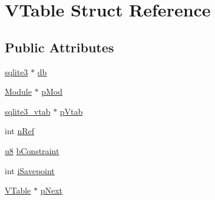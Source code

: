 \hypertarget{struct_v_table}{\section{V\-Table Struct Reference}
\label{struct_v_table}
}
\subsection*{Public Attributes}
\begin{DoxyCompactItemize}
\item 
\hyperlink{structsqlite3}{sqlite3} $\ast$ \hyperlink{struct_v_table_a855b43c118d693910e9060cc9d9ac91a}{db}
\item 
\hyperlink{struct_module}{Module} $\ast$ \hyperlink{struct_v_table_ae444452a7168e2f4224a75768abe8312}{p\-Mod}
\item 
\hyperlink{structsqlite3__vtab}{sqlite3\-\_\-vtab} $\ast$ \hyperlink{struct_v_table_ae15b9cb002c013019dcbac919bda9ac8}{p\-Vtab}
\item 
int \hyperlink{struct_v_table_a12ffe156e5e8e7d19ed029ccfe4ab5dc}{n\-Ref}
\item 
\hyperlink{sqlite3_8c_a74a0f6424ae628af25f23f0a35f6ead3}{u8} \hyperlink{struct_v_table_a5a970416a76dbe3be500c9458c89550d}{b\-Constraint}
\item 
int \hyperlink{struct_v_table_a19f1c6c5f5fedabba7e605bbe15358e4}{i\-Savepoint}
\item 
\hyperlink{struct_v_table}{V\-Table} $\ast$ \hyperlink{struct_v_table_af3cac5e5a38508d0111acb9aa6c5f435}{p\-Next}
\end{DoxyCompactItemize}


